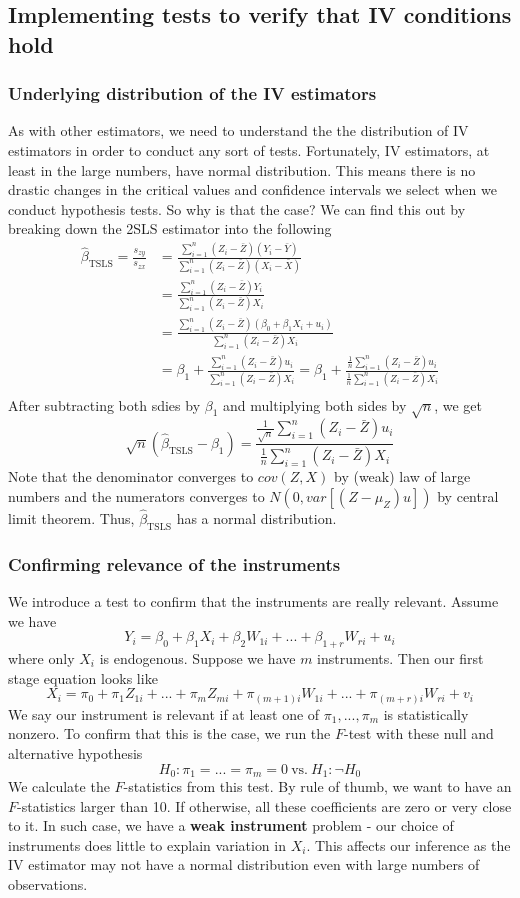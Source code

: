 \documentclass[12pt]{article}
\theoremstyle{definition}
\theoremstyle{property}
\theoremstyle{assumption}
\theoremstyle{example}
\theoremstyle{comment}
\begin{document}
\subsection{Implementing tests to verify that IV conditions hold}
\subsubsection{Underlying distribution of the IV estimators}
As with other estimators, we need to understand the the distribution of IV estimators in order to conduct any sort of tests. Fortunately, IV estimators, at least in the large numbers, have normal distribution. This means there is no drastic changes in the critical values and confidence intervals we select when we conduct hypothesis tests. So why is that the case? We can find this out by breaking down the 2SLS estimator into the following
\[
\begin{aligned}
\hat{\beta}_{\text{TSLS}}=\frac{s_{zy}}{s_{zx}}&=\frac{\sum_{i=1}^n(Z_i-\bar{Z})(Y_i-\bar{Y})}{\sum_{i=1}^n(Z_i-\bar{Z})(X_i-\bar{X})}\\
&= \frac{\sum_{i=1}^n(Z_i-\bar{Z})Y_i}{\sum_{i=1}^n(Z_i-\bar{Z})X_i}\\
&= \frac{\sum_{i=1}^n(Z_i-\bar{Z})(\beta_0+\beta_1X_i + u_i)}{\sum_{i=1}^n(Z_i-\bar{Z})X_i}\\
&= \beta_1+\frac{\sum_{i=1}^n(Z_i-\bar{Z})u_i}{\sum_{i=1}^n(Z_i-\bar{Z})X_i}=\beta_1+\frac{\frac{1}{n}\sum_{i=1}^n(Z_i-\bar{Z})u_i}{\frac{1}{n}\sum_{i=1}^n(Z_i-\bar{Z})X_i}\\
\end{aligned}
\]
After subtracting both sdies by $\beta_1$ and multiplying both sides by $\sqrt{n}$, we get
\[
\sqrt{n}(\hat{\beta}_{\text{TSLS}}-\beta_1)=\frac{\frac{1}{\sqrt{n}}\sum_{i=1}^n(Z_i-\bar{Z})u_i}{\frac{1}{n}\sum_{i=1}^n(Z_i-\bar{Z})X_i}
\]
Note that the denominator converges to $cov(Z,X)$ by (weak) law of large numbers and the numerators converges to $N(0, var[(Z-\mu_Z)u])$ by central limit theorem. Thus, $\hat{\beta}_{\text{TSLS}}$ has a normal distribution.
\subsubsection{Confirming relevance of the instruments}
We introduce a test to confirm that the instruments are really relevant. Assume we have
\[
Y_i = \beta_0 + \beta_1X_i + \beta_2 W_{1i}+...+\beta_{1+r}W_{ri}+u_i
\]
where only $X_i$ is endogenous. Suppose we have $m$ instruments. Then our first stage equation looks like
\[
X_i = \pi_0 + \pi_1Z_{1i}+...+\pi_mZ_{mi} + \pi_{(m+1)i} W_{1i}+...+ \pi_{(m+r)i}W_{ri}+v_i
\]
We say our instrument is relevant if at least one of $\pi_1,...,\pi_m$ is statistically nonzero. To confirm that this is the case, we run the $F$-test with these null and alternative hypothesis
\[
H_0: \pi_1 = ... = \pi_m=0 \ \text{vs.} \ H_1: \lnot H_0
\]
We calculate the $F$-statistics from this test. By rule of thumb, we want to have an $F$-statistics larger than 10. If otherwise, all these coefficients are zero or very close to it. In such case, we have a \textbf{weak instrument} problem - our choice of instruments does little to explain variation in $X_i$.  This affects our inference as the IV estimator may not have a normal distribution even with large numbers of observations. 
\end{document}
